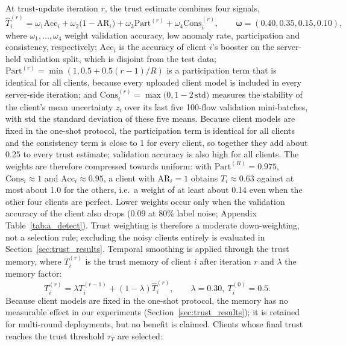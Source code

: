 \documentclass[pdflatex,sn-mathphys-num]{sn-jnl}
\newcommand{\Rtwo}{\color{blue}}
\begin{document}
{At trust-update iteration $r$, the trust estimate combines four signals,
\begin{equation}
\hat T_i^{(r)}=\omega_1\mathrm{Acc}_i+\omega_2\big(1-\mathrm{AR}_i\big)+\omega_3\mathrm{Part}^{(r)}+\omega_4\mathrm{Cons}_i^{(r)},\qquad \boldsymbol{\omega}=(0.40,0.35,0.15,0.10),\label{eq:trust}
\end{equation}
where $\omega_1,\dots,\omega_4$ weight validation accuracy, low anomaly rate, participation and consistency, respectively; $\mathrm{Acc}_i$ is the accuracy of client $i$'s booster on the server-held validation split, which is disjoint from the test data; $\mathrm{Part}^{(r)}=\min(1,0.5+0.5(r-1)/R)$ is a participation term that is identical for all clients, because every uploaded client model is included in every server-side iteration; and $\mathrm{Cons}_i^{(r)}=\max\big(0,1-2\,\mathrm{std}\big)$ measures the stability of the client's mean uncertainty $z_i$ over its last five 100-flow validation mini-batches, with std the standard deviation of these five means. {\Rtwo Because client models are fixed in the one-shot protocol, the participation term is identical for all clients and the consistency term is close to 1 for every client, so together they add about 0.25 to every trust estimate; validation accuracy is also high for all clients. The weights are therefore compressed towards uniform: with $\mathrm{Part}^{(R)}=0.975$, $\mathrm{Cons}_i\approx1$ and $\mathrm{Acc}_i\approx0.95$, a client with $\mathrm{AR}_i=1$ obtains $\hat T_i\approx0.63$ against at most about 1.0 for the others, i.e.\ a weight of at least about 0.14 even when the other four clients are perfect. Lower weights occur only when the validation accuracy of the client also drops (0.09 at 80\% label noise; Appendix Table~\ref{tab:a_detect}). Trust weighting is therefore a moderate down-weighting, not a selection rule; excluding the noisy clients entirely is evaluated in Section~\ref{sec:trust_results}.} Temporal smoothing is applied through the trust memory,
where $T_i^{(r)}$ is the trust memory of client $i$ after iteration $r$ and $\lambda$ the memory factor:
\begin{equation}
T_i^{(r)}=\lambda T_i^{(r-1)}+(1-\lambda)\hat T_i^{(r)},\qquad \lambda=0.30,\ T_i^{(0)}=0.5.\label{eq:memory}
\end{equation}
Because client models are fixed in the one-shot protocol, the memory has no measurable effect in our experiments (Section~\ref{sec:trust_results}); it is retained for multi-round deployments, but no benefit is claimed. Clients whose final trust reaches the trust threshold $\tau_T$ are selected:
}
\end{document}

